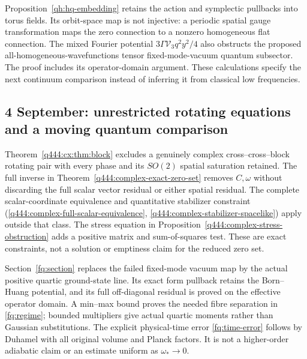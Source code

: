 Proposition~\ref{qh:hq-embedding} retains the action and symplectic
pullbacks into torus fields. Its orbit-space map is not injective:
a periodic spatial gauge transformation maps the zero connection
to a nonzero homogeneous flat connection. The mixed Fourier
potential $3\Gamma\mathcal V_3q^2y^2/4$ also obstructs the proposed
all-homogeneous-wavefunctions tensor fixed-mode-vacuum quantum
subsector. The proof includes its operator-domain argument.
These calculations specify the next continuum comparison instead
of inferring it from classical low frequencies.

\subsection*{4 September: unrestricted rotating equations and a moving quantum comparison}
Theorem~\ref{q444:cx:thm:block} excludes a genuinely complex
cross--cross--block rotating pair with every phase and its $SO(2)$
spatial saturation retained. The full inverse in
Theorem~\ref{q444:complex-exact-zero-set} removes $C,\omega$ without
discarding the full scalar vector residual or either spatial residual.
The complete scalar-coordinate equivalence and quantitative stabilizer
constraint (\ref{q444:complex-full-scalar-equivalence},
\ref{q444:complex-stabilizer-spacelike}) apply outside that class.
The stress equation in Proposition~\ref{q444:complex-stress-obstruction}
adds a positive matrix and sum-of-squares test. These are exact
constraints, not a solution or emptiness claim for the reduced zero set.

Section~\ref{fq:section} replaces the failed fixed-mode vacuum map by
the actual positive quartic ground-state line. Its exact form pullback
retains the Born--Huang potential, and its full off-diagonal residual
is proved on the effective operator domain. A min--max bound proves
the needed fibre separation in \eqref{fq:regime}; bounded multipliers
give actual quartic moments rather than Gaussian substitutions.
The explicit physical-time error \eqref{fq:time-error} follows by
Duhamel with all original volume and Planck factors. It is not a
higher-order adiabatic claim or an estimate uniform as $\omega_*\to0$.

